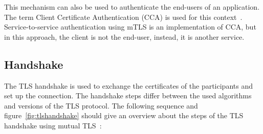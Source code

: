 This mechanism can also be used to authenticate the end-users of an application.
The term Client Certificate Authentication (CCA) is used for this context~\cite{parsovs2013practical}.
Service-to-service authentication using mTLS is an implementation of CCA, but in this approach, the client is not the end-user, instead, it is another service.

\subsection{Handshake}
\label{sec:tlshandshake_details}
The TLS handshake is used to exchange the certificates of the participants and set up the connection.
The handshake steps differ between the used algorithms and versions of the TLS protocol.
The following sequence and figure~\ref{fig:tlshandshake} should give an overview about the steps of the TLS handshake using mutual TLS~\cite{parsovs2013practical}:
